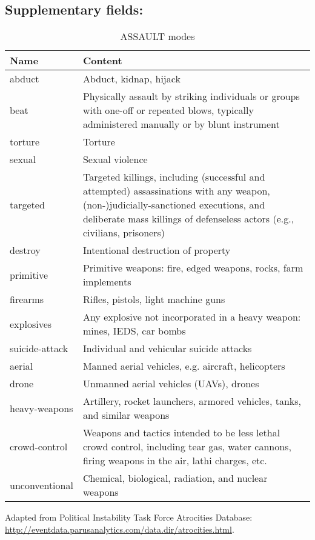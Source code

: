 \documentclass[11pt]{report}
\newcommand{\txt}[1]{\texttt{#1}}
\begin{document}
\subsection{Supplementary fields:}


\begin{table}[htp]
\caption{ASSAULT modes}
\begin{center}
\begin{tabular}{|p{}|p{}|}
\hline
Name & Content \\
\hline
abduct & Abduct, kidnap, hijack \\
beat & Physically assault by striking individuals or groups with one-off or repeated blows, typically administered manually or by blunt instrument\\
torture & Torture \\
sexual & Sexual violence\\
targeted & Targeted killings, including (successful and attempted) assassinations with any weapon, (non-)judicially-sanctioned executions, and deliberate mass killings of defenseless actors (e.g., civilians, prisoners)  \\
destroy & Intentional destruction of property \\
primitive & Primitive weapons: fire, edged weapons, rocks, farm implements \\
firearms & Rifles, pistols, light machine guns\\
explosives & Any explosive not incorporated in a heavy weapon: mines, IEDS, car bombs \\
suicide-attack & Individual and vehicular suicide attacks \\
aerial & Manned aerial vehicles, e.g. aircraft, helicopters \\
drone & Unmanned aerial vehicles (UAVs), drones \\
heavy-weapons & Artillery, rocket launchers, armored vehicles, tanks, and similar weapons \\
crowd-control & Weapons and tactics intended to be less lethal crowd control, including tear gas, water cannons, firing weapons in the air, lathi charges, etc. \\
unconventional & Chemical, biological, radiation, and nuclear weapons  \\
\hline
\end{tabular}
\end{center}
\label{tab:violmode}
\raggedright{Adapted from Political Instability Task Force Atrocities Database: \url{http://eventdata.parusanalytics.com/data.dir/atrocities.html}}.
\end{table}%
\end{document}
